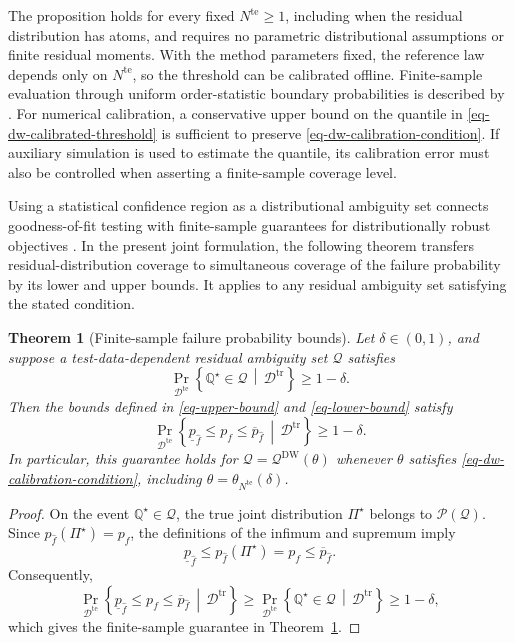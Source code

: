 \documentclass[review,11pt,3p,authoryear,nopreprintline]{elsarticle}
\newtheorem{theorem}{Theorem}
\begin{document}
The proposition holds for every fixed $N^{\mathrm{te}}\ge1$, including when the residual distribution has atoms, and requires no parametric distributional assumptions or finite residual moments. With the method parameters fixed, the reference law depends only on $N^{\mathrm{te}}$, so the threshold can be calibrated offline. Finite-sample evaluation through uniform order-statistic boundary probabilities is described by \citet[Supplement, Sections~S.6--S.7]{L.J23}. For numerical calibration, a conservative upper bound on the quantile in \eqref{eq-dw-calibrated-threshold} is sufficient to preserve \eqref{eq-dw-calibration-condition}. If auxiliary simulation is used to estimate the quantile, its calibration error must also be controlled when asserting a finite-sample coverage level.

Using a statistical confidence region as a distributional ambiguity set connects goodness-of-fit testing with finite-sample guarantees for distributionally robust objectives \citep{B.G.K18}. In the present joint formulation, the following theorem transfers residual-distribution coverage to simultaneous coverage of the failure probability by its lower and upper bounds. It applies to any residual ambiguity set satisfying the stated condition.

\begin{theorem}[Finite-sample failure probability bounds]
  \label{theorem-01}
  Let $\delta\in(0,1)$, and suppose a test-data-dependent residual ambiguity set $\mathscr Q$ satisfies
  \[
    \Pr_{\mathcal D^{\mathrm{te}}}\left\{\mathbb Q^\star\in\mathscr Q\,\middle|\,\mathcal D^{\mathrm{tr}}\right\}\ge1-\delta.
  \]
  Then the bounds defined in \eqref{eq-upper-bound} and \eqref{eq-lower-bound} satisfy
  \begin{equation}
    \Pr_{\mathcal D^{\mathrm{te}}}\left\{\underline p_{\hat f}\le p_f\le\overline p_{\hat f}\,\middle|\,\mathcal D^{\mathrm{tr}}\right\}\ge1-\delta.
    \label{eq-failure-probability-coverage}
  \end{equation}
  In particular, this guarantee holds for $\mathscr Q=\mathscr Q^{\mathrm{DW}}(\theta)$ whenever $\theta$ satisfies \eqref{eq-dw-calibration-condition}, including $\theta=\theta_{N^{\mathrm{te}}}(\delta)$.
\end{theorem}
\begin{proof}
  On the event $\mathbb Q^\star\in\mathscr Q$, the true joint distribution $\Pi^\star$ belongs to $\mathscr P(\mathscr Q)$. Since $p_{\hat f}(\Pi^\star)=p_f$, the definitions of the infimum and supremum imply
  \[
    \underline p_{\hat f}\le p_{\hat f}(\Pi^\star)=p_f\le\overline p_{\hat f}.
  \]
  Consequently,
  \[
    \Pr_{\mathcal D^{\mathrm{te}}}\left\{\underline p_{\hat f}\le p_f\le\overline p_{\hat f}\,\middle|\,\mathcal D^{\mathrm{tr}}\right\}\ge\Pr_{\mathcal D^{\mathrm{te}}}\left\{\mathbb Q^\star\in\mathscr Q\,\middle|\,\mathcal D^{\mathrm{tr}}\right\}\ge1-\delta,
  \]
  which gives the finite-sample guarantee in Theorem~\ref{theorem-01}.
\end{proof}
\end{document}
